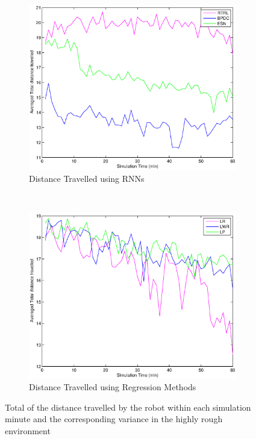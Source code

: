 \documentclass[msc,ai,logo]{infthesis}
\begin{document}
\begin{figure}[H]
        \centering
        \label{fig:15_DIST}
        \begin{subfigure}[b]{0.5\textwidth}
                \centering
                \includegraphics[width=\textwidth]{RNN_15_DIST.eps}
                \caption{Distance Travelled using RNNs}
              \label{fig:RNN_15_DIST}  
        \end{subfigure}%
        ~ %
        \begin{subfigure}[b]{0.5\textwidth}
                \centering
                \includegraphics[width=\textwidth]{LR_15_DIST.eps}
                \caption{Distance Travelled using Regression Methods}
               \label{fig:LR_15_DIST}  
        \end{subfigure}
        \caption{Total of the distance travelled by the robot within each simulation minute and the corresponding variance in the highly rough environment}
        \label{fig:15_DIST}
\end{figure}
\end{document}
